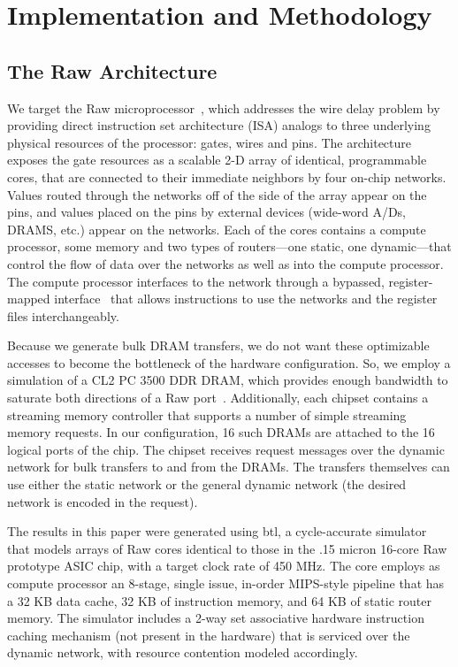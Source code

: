 \section{Implementation and Methodology}

\subsection{The Raw Architecture}
\label{sec:raw}

We target the Raw microprocessor~\cite{raw10,raw}, which addresses the
wire delay problem by providing direct instruction set
architecture (ISA) analogs to three underlying physical resources of
the processor: gates, wires and pins. The architecture exposes the
gate resources as a scalable 2-D array of identical, programmable
cores, that are connected to their immediate neighbors by four on-chip
networks.  Values routed through the networks off of the side of the
array appear on the pins, and values placed on the pins by external
devices (wide-word A/Ds, DRAMS, etc.) appear on the networks.  Each of
the cores contains a compute processor, some memory and two types of
routers---one static, one dynamic---that control the flow of data over
the networks as well as into the compute processor.  The compute
processor interfaces to the network through a bypassed,
register-mapped interface~\cite{raw10} that allows instructions to use
the networks and the register files interchangeably.

Because we generate bulk DRAM transfers, we do not want these
optimizable accesses to become the bottleneck of the hardware
configuration.  So, we employ a simulation of a CL2 PC 3500 DDR DRAM,
which provides enough bandwidth to saturate both directions of a Raw
port~\cite{raw_isca}.  Additionally, each chipset contains a streaming
memory controller that supports a number of simple streaming memory
requests. In our configuration, 16 such DRAMs are attached to the 16
logical ports of the chip.  The chipset receives request messages over
the dynamic network for bulk transfers to and from the DRAMs.  The
transfers themselves can use either the static network or the general
dynamic network (the desired network is encoded in the request).

The results in this paper were generated using btl, a cycle-accurate
simulator that models arrays of Raw cores identical to those in the
.15 micron 16-core Raw prototype ASIC chip, with a target clock rate
of 450 MHz. The core employs as compute processor an 8-stage, single
issue, in-order MIPS-style pipeline that has a 32 KB data cache, 32 KB
of instruction memory, and 64 KB of static router memory.  The
simulator includes a 2-way set associative hardware instruction
caching mechanism (not present in the hardware) that is serviced over
the dynamic network, with resource contention modeled accordingly.

